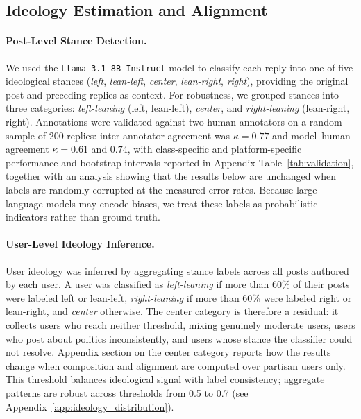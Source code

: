 \documentclass[letterpaper]{article} %
\newcommand{\rev}[1]{{\color{blue}#1}}
\begin{document}
\subsection{Ideology Estimation and Alignment}

\paragraph*{Post-Level Stance Detection.}
We used the \texttt{Llama-3.1-8B-Instruct} model to classify each reply into one of five ideological stances (\textit{left}, \textit{lean-left}, \textit{center}, \textit{lean-right}, \textit{right}), providing the original post and preceding replies as context. For robustness, we grouped stances into three categories: \textit{left-leaning} (left, lean-left), \textit{center}, and \textit{right-leaning} (lean-right, right). Annotations were validated against two human annotators on a random sample of 200 replies\rev{: inter-annotator agreement was $\kappa = 0.77$ and model--human agreement $\kappa = 0.61$ and $0.74$, with class-specific and platform-specific performance and bootstrap intervals reported in Appendix Table~\ref{tab:validation}, together with an analysis showing that the results below are unchanged when labels are randomly corrupted at the measured error rates}. Because large language models may encode biases, we treat these labels as probabilistic indicators rather than ground truth.

\paragraph*{User-Level Ideology Inference.}
User ideology was inferred by aggregating stance labels across all posts authored by each user. A user was classified as \textit{left-leaning} if more than 60\% of their posts were labeled left or lean-left, \textit{right-leaning} if more than 60\% were labeled right or lean-right, and \textit{center} otherwise. \rev{The center category is therefore a residual: it collects users who reach neither threshold, mixing genuinely moderate users, users who post about politics inconsistently, and users whose stance the classifier could not resolve. Appendix section on the center category reports how the results change when composition and alignment are computed over partisan users only.} This threshold balances ideological signal with label consistency; aggregate patterns are robust across thresholds from 0.5 to 0.7 (see Appendix~\ref{app:ideology_distribution}). 
\end{document}
